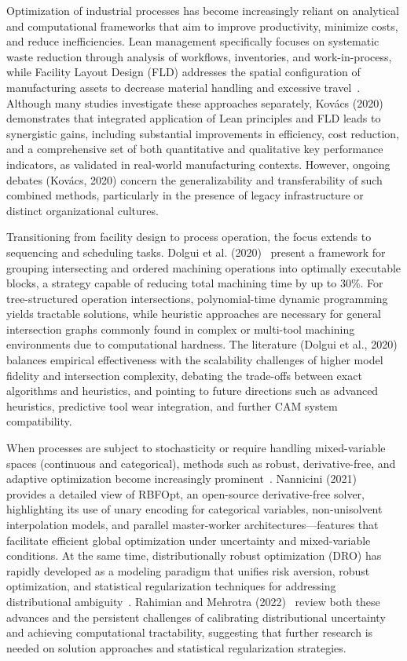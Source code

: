 \documentclass[sigconf]{acmart}
\begin{document}
Optimization of industrial processes has become increasingly reliant on analytical and computational frameworks that aim to improve productivity, minimize costs, and reduce inefficiencies. Lean management specifically focuses on systematic waste reduction through analysis of workflows, inventories, and work-in-process, while Facility Layout Design (FLD) addresses the spatial configuration of manufacturing assets to decrease material handling and excessive travel~\cite{ref81}. Although many studies investigate these approaches separately, Kovács (2020)~\cite{ref81} demonstrates that integrated application of Lean principles and FLD leads to synergistic gains, including substantial improvements in efficiency, cost reduction, and a comprehensive set of both quantitative and qualitative key performance indicators, as validated in real-world manufacturing contexts. However, ongoing debates (Kovács, 2020) concern the generalizability and transferability of such combined methods, particularly in the presence of legacy infrastructure or distinct organizational cultures.

Transitioning from facility design to process operation, the focus extends to sequencing and scheduling tasks. Dolgui et al. (2020)~\cite{ref82} present a framework for grouping intersecting and ordered machining operations into optimally executable blocks, a strategy capable of reducing total machining time by up to 30\%. For tree-structured operation intersections, polynomial-time dynamic programming yields tractable solutions, while heuristic approaches are necessary for general intersection graphs commonly found in complex or multi-tool machining environments due to computational hardness. The literature (Dolgui et al., 2020) balances empirical effectiveness with the scalability challenges of higher model fidelity and intersection complexity, debating the trade-offs between exact algorithms and heuristics, and pointing to future directions such as advanced heuristics, predictive tool wear integration, and further CAM system compatibility.

When processes are subject to stochasticity or require handling mixed-variable spaces (continuous and categorical), methods such as robust, derivative-free, and adaptive optimization become increasingly prominent~\cite{ref77,ref78}. Nannicini (2021)~\cite{ref76} provides a detailed view of RBFOpt, an open-source derivative-free solver, highlighting its use of unary encoding for categorical variables, non-unisolvent interpolation models, and parallel master-worker architectures—features that facilitate efficient global optimization under uncertainty and mixed-variable conditions. At the same time, distributionally robust optimization (DRO) has rapidly developed as a modeling paradigm that unifies risk aversion, robust optimization, and statistical regularization techniques for addressing distributional ambiguity~\cite{ref77}. Rahimian and Mehrotra (2022)~\cite{ref77} review both these advances and the persistent challenges of calibrating distributional uncertainty and achieving computational tractability, suggesting that further research is needed on solution approaches and statistical regularization strategies.
\end{document}
